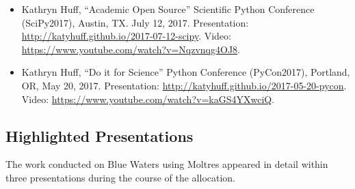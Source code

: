 \documentclass[letterpaper]{article}
\begin{document}
\begin{itemize}
\item Kathryn Huff, ``Academic Open Source'' Scientific Python Conference 
(SciPy2017), Austin, TX. July 12, 2017.  
Presentation: \url{http://katyhuff.github.io/2017-07-12-scipy}. Video: 
\url{https://www.youtube.com/watch?v=Nqzvnqg4OJ8}.
\item Kathryn Huff, ``Do it for Science'' Python Conference (PyCon2017),
Portland, OR, May 20, 2017. Presentation: \url{http://katyhuff.github.io/2017-05-20-pycon}.
Video: \url{https://www.youtube.com/watch?v=kaGS4YXwciQ}.
\end{itemize}

\subsection{Highlighted Presentations} The work conducted on Blue Waters using 
Moltres appeared in detail within three presentations during the course of the 
allocation. 
\end{document}
